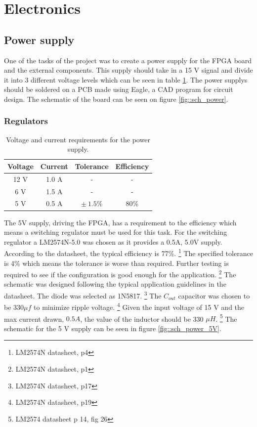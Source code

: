 \section{Electronics}
\subsection{Power supply}
One of the tasks of the project was to create a power supply for the FPGA board and the external components. This supply should take in a 15 V signal and divide it into 3 different voltage levels which can be seen in table \ref{tab::power_req}. The power supplys should be soldered on a PCB made using Eagle, a CAD program for circuit design. The schematic of the board can be seen on figure \ref{fig::sch_power}.
\subsubsection{Regulators}
\begin{table}
 \vspace{5 pt}
 \begin{tabular}{cccc}
  Voltage & Current & Tolerance      & Efficiency \\ \toprule
  12 V    & 1.0 A   & -              & -          \\
  6 V     & 1.5 A   & -              & -          \\
  5 V     & 0.5 A   & $\pm\ 1.5 \%$  & 80\%       \\
  \bottomrule
 \end{tabular}
\caption{Voltage and current requirements for the power supply.}
\label{tab::power_req}
 \vspace{5 pt}
\end{table}
The 5V supply, driving the FPGA, has a requirement to the efficiency which means a switching regulator must be used for this task. 
For the switching regulator a LM2574N-5.0 was chosen as it provides a 0.5A, 5.0V supply.
According to the datasheet, the typical efficiency is 77\%.
\footnote{LM2574N datasheet, p4}
The specified tolerance is 4\% which means the tolerance is worse than required. Further testing is required to see if the configuration is good enough for the application.
\footnote{LM2574N datasheet, p1}
The schematic was designed following the typical application guidelines in the datasheet.
The diode was selected as 1N5817. 
\footnote{LM2574N datasheet, p17}
The $C_{out}$ capacitor was chosen to be $330\mu f$ to minimize ripple voltage.
\footnote{LM2574N datasheet, p19}
Given the input voltage of 15 V and the max current drawn, $0.5 A$, the value of the inductor should be 330 $\mu H$. 
\footnote{LM2574 datasheet p 14, fig 26}
The schematic for the 5 V supply can be seen in figure \ref{fig::sch_power_5V}.

